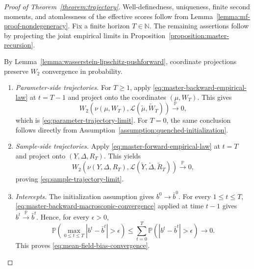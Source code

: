 \begin{proof}[Proof of Theorem~\ref{theorem:trajectory}]
Well-definedness, uniqueness, finite second moments, and
atomlessness of the effective scores follow from
Lemma~\ref{lemma:mf-proof-nondegeneracy}.
Fix a finite horizon $T\in\mathbb N$.
The remaining assertions follow by projecting the joint
empirical limits in
Proposition~\ref{proposition:master-recursion}.

By Lemma~\ref{lemma:wasserstein-lipschitz-pushforward},
coordinate projections preserve $W_2$ convergence in probability.
\begin{enumerate}[label=(\roman*),wide]
    \item \emph{Parameter-side trajectories.}
    For $T\geq1$, apply
    \eqref{eq:master-backward-empirical-law}
    at $t=T-1$ and project onto the coordinates
    $(\mu,W_T)$. This gives
    \[
        W_2\left(
            \nu(\mu,W_T),
            \mathscr L(\tilde\mu,\tilde W_T)
        \right)
        \xrightarrow{\mathbb P}0,
    \]
    which is \eqref{eq:parameter-trajectory-limit}.
    For $T=0$, the same conclusion follows directly
    from Assumption~\ref{assumption:quenched-initialization}.

    \item \emph{Sample-side trajectories.}
    Apply \eqref{eq:master-forward-empirical-law}
    at $t=T$ and project onto $(Y,\Delta,R_T)$.
    This yields
    \[
        W_2\left(
            \nu(Y,\Delta,R_T),
            \mathscr L(\tilde Y,\tilde\Delta,\tilde R_T)
        \right)
        \xrightarrow{\mathbb P}0,
    \]
    proving \eqref{eq:sample-trajectory-limit}.

    \item \emph{Intercepts.}
    The initialization assumption gives
    $b^0\to\bar b^0$.
    For every $1\leq t\leq T$,
    \eqref{eq:master-backward-macroscopic-convergence}
    applied at time $t-1$ gives
    $b^t\xrightarrow{\mathbb P}\bar b^t$.
    Hence, for every $\epsilon>0$,
    \[
        \mathbb P\left(
            \max_{0\leq t\leq T}|b^t-\bar b^t|>\epsilon
        \right)
        \leq
        \sum_{t=0}^T
        \mathbb P(|b^t-\bar b^t|>\epsilon)
        \longrightarrow0.
    \]
    This proves \eqref{eq:mean-field-bias-convergence}.
\end{enumerate}
\end{proof}

